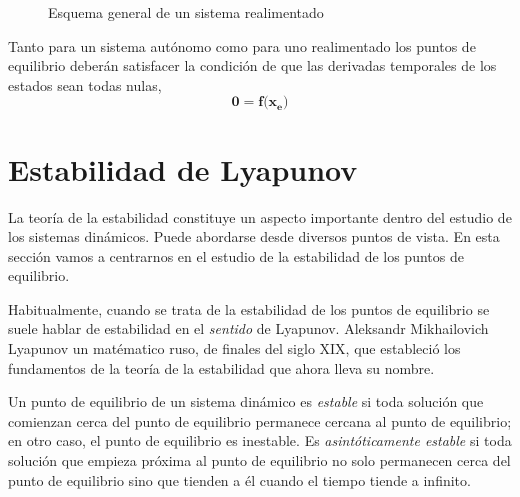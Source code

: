 \begin{figure}
\centering
{}

\caption{Esquema general de un sistema realimentado}\label{fig:rea}
\end{figure}

Tanto para un sistema autónomo como para uno realimentado los puntos de equilibrio deberán satisfacer la condición de que las derivadas temporales de los estados sean todas nulas,
\begin{equation}
\mathbf{0} = \mathbf{f(x_e})
\end{equation}

\section{Estabilidad de Lyapunov}
La teoría de la estabilidad constituye un aspecto importante dentro del estudio de los sistemas dinámicos. Puede abordarse desde diversos puntos de vista. En esta sección vamos a centrarnos en el estudio de la estabilidad de los puntos de equilibrio. 

Habitualmente, cuando se trata de la estabilidad de los puntos de equilibrio se suele hablar de estabilidad en el \emph{sentido} de Lyapunov. Aleksandr Mikhailovich Lyapunov un matématico ruso, de finales del siglo XIX, que estableció los fundamentos de la teoría de la estabilidad que ahora lleva su nombre.

Un punto de equilibrio de un sistema dinámico es \emph{estable} si toda  solución que comienzan cerca del punto de equilibrio permanece cercana al punto de equilibrio; en otro caso, el punto de equilibrio es inestable. Es \emph{asintóticamente estable} si toda solución que empieza próxima al punto de equilibrio no solo permanecen cerca del punto de equilibrio sino que tienden a él cuando el tiempo tiende a infinito.

